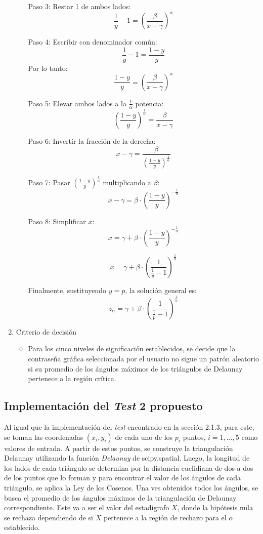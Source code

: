 \documentclass[12pt]{report}
\begin{document}
\begin{enumerate}
\begin{itemize}
		Paso 3: Restar 1 de ambos lados:
		\[
		\frac{1}{y} - 1 = \left( \frac{\beta}{x - \gamma} \right)^\alpha
		\]
		
		Paso 4: Escribir con denominador común:
		\[
		\frac{1}{y} - 1 = \frac{1 - y}{y}
		\]
		Por lo tanto:
		\[
		\frac{1 - y}{y} = \left( \frac{\beta}{x - \gamma} \right)^\alpha
		\]
		
		Paso 5: Elevar ambos lados a la \( \frac{1}{\alpha} \) potencia:
		\[
		\left( \frac{1 - y}{y} \right)^{\frac{1}{\alpha}} = \frac{\beta}{x - \gamma}
		\]
		
		Paso 6: Invertir la fracción de la derecha:
		\[
		x - \gamma = \frac{\beta}{\left( \frac{1 - y}{y} \right)^{\frac{1}{\alpha}}}
		\]
				
		Paso 7: Pasar \( \left( \frac{1 - y}{y} \right)^{\frac{1}{\alpha}} \) multiplicando a \( \beta \):
		\[
		x - \gamma = \beta \cdot \left( \frac{1 - y}{y} \right)^{-\frac{1}{\alpha}}
		\]
		
		Paso 8: Simplificar \( x \):
		\[
		x = \gamma + \beta \cdot \left( \frac{1 - y}{y} \right)^{-\frac{1}{\alpha}}
		\]
		
		\[
		x = \gamma + \beta \cdot \left( \frac{1}{\frac{1}{y}-1} \right)^{\frac{1}{\alpha}}
		\]
		
		Finalmente, sustituyendo \( y = p \), la solución general es:
		\[
		 z_\alpha = \gamma + \beta \cdot \left( \frac{1}{\frac{1}{p}-1} \right)^{\frac{1}{\alpha}}
		\]
		
		
	\end{itemize}
	\item Criterio de decisión
	\begin{itemize}
		\item Para los cinco niveles de significación establecidos, se decide que la contraseña gráfica seleccionada por el usuario no sigue un patrón aleatorio si su promedio de los ángulos máximos de los triángulos de Delaunay  pertenece a la región crítica. 
	\end{itemize}
\end{enumerate}
\subsection{Implementación del \textit{Test} 2 propuesto }
\label{sec:2.3}

Al igual que  la implementación del \textit{test} encontrado en la sección 2.1.3, para este, se toman las coordenadas \((x_i, y_i)\) de cada uno de los \(p_i\) puntos, \(i = 1, \ldots, 5\) como valores de entrada. A partir de estos puntos, se construye la triangulación Delaunay utilizando la función \textit{Delaunay} de scipy.spatial.
Luego, la longitud de los lados de cada triángulo se determina por la distancia euclidiana de dos a dos de los puntos que lo forman y para encontrar el valor de los ángulos de cada triángulo, se aplica la Ley de los Cosenos. Una ves obtenidos todos los ángulos, se busca el promedio de los ángulos máximos  de la triangulación de Delaunay correspondiente.  Este va a ser el valor del estadígrafo \(X\), donde la hipótesis nula se rechaza dependiendo de si  \(X\) pertenece a la región de rechazo para el \(\alpha\) establecido. 
\end{document}
